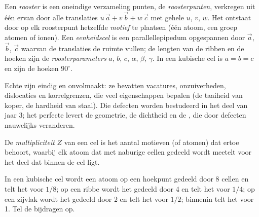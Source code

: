 \begin{definition}\label{def:b1:crystals-metals:lattice}
Een \emph{rooster} is een oneindige verzameling punten, de
\emph{roosterpunten}, verkregen uit één ervan door alle
translaties $u\,\vec a + v\,\vec b + w\,\vec c$ met gehele $u$, $v$,
$w$. Het  ontstaat door op elk roosterpunt hetzelfde
\emph{motief} te plaatsen (één atoom, een groep atomen of
ionen). Een \emph{eenheidscel} is een parallellepipedum
opgespannen door $\vec a$, $\vec b$, $\vec c$ waarvan de translaties de
ruimte vullen; de lengten van de ribben en de hoeken zijn de
\emph{roosterparameters}
$a$, $b$, $c$, $\alpha$, $\beta$, $\gamma$. In een kubische cel is
$a = b = c$ en zijn de hoeken $90^\circ$.
\end{definition}

\begin{remark}\label{rem:b1:crystals-metals:real}
Echte  zijn eindig en onvolmaakt: ze bevatten vacatures,
onzuiverheden, dislocaties en korrelgrenzen, die veel eigenschappen
bepalen (de taaiheid van koper, de hardheid van staal). Die defecten
worden bestudeerd in het deel van jaar 3; het perfecte  levert de
geometrie, de dichtheid en de , die door defecten nauwelijks
veranderen.
\end{remark}

\begin{definition}\label{def:b1:crystals-metals:multiplicity}
De \emph{multipliciteit} $Z$ van een cel is het
aantal motieven (of atomen) dat ertoe behoort, waarbij elk atoom dat met
naburige cellen gedeeld wordt meetelt voor het deel dat binnen de cel
ligt.
\end{definition}

\begin{method}\label{met:b1:crystals-metals:count}
In een kubische cel wordt een atoom op een hoekpunt gedeeld door 8 cellen
en telt het voor $1/8$; op een ribbe wordt het gedeeld door 4 en telt het
voor $1/4$; op een zijvlak wordt het gedeeld door 2 en telt het voor
$1/2$; binnenin telt het voor 1. Tel de bijdragen op.
\end{method}

